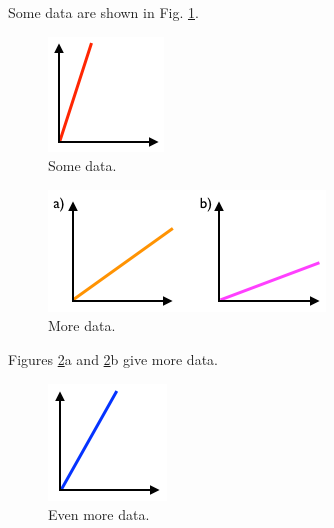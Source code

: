 Some data are shown in Fig. \ref{fig:data}.

\begin{figure}[htbp]
\centering
\includegraphics{img/plot1.png}
\caption{Some data.\label{fig:data}}
\end{figure}

\begin{figure}[htbp]
\centering
\includegraphics{img/plot2.png}
\caption{More data.\label{fig:more}}
\end{figure}

Figures \ref{fig:more}a and \ref{fig:more}b give more data.

\begin{figure}[htbp]
\centering
\includegraphics{img/plot3.png}
\caption{Even more data.\label{fig:__-4063619105080515753__}}
\end{figure}
